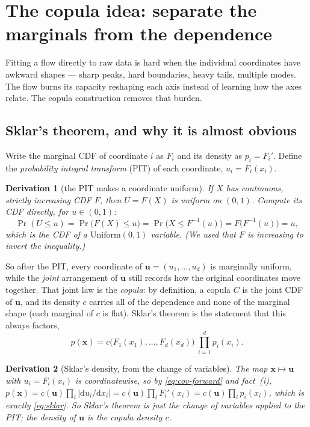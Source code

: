 \documentclass[11pt]{article}
\newcommand{\x}{\bm{x}}
\newcommand{\uu}{\bm{u}}
\newtheorem*{deriv}{Derivation}
\theoremstyle{remark}
\begin{document}
\section{The copula idea: separate the marginals from the dependence}
\label{sec:copula}

Fitting a flow directly to raw data is hard when the individual coordinates have
awkward shapes --- sharp peaks, hard boundaries, heavy tails, multiple modes.
The flow burns its capacity reshaping each axis instead of learning how the axes
relate. The copula construction removes that burden.

\subsection{Sklar's theorem, and why it is almost obvious}

Write the marginal CDF of coordinate $i$ as $F_i$ and its density as
$p_i=F_i'$. Define the \emph{probability integral transform} (PIT) of each
coordinate, $u_i=F_i(x_i)$.

\begin{deriv}[the PIT makes a coordinate uniform]
If $X$ has continuous, strictly increasing CDF $F$, then $U=F(X)$ is uniform on
$(0,1)$. Compute its CDF directly, for $u\in(0,1)$:
\begin{equation}
\Pr(U\le u)=\Pr\bigl(F(X)\le u\bigr)=\Pr\bigl(X\le F^{-1}(u)\bigr)
= F\bigl(F^{-1}(u)\bigr)=u,
\end{equation}
which is the CDF of a $\mathrm{Uniform}(0,1)$ variable. (We used that $F$ is
increasing to invert the inequality.)
\end{deriv}

So after the PIT, every coordinate of $\uu=(u_1,\dots,u_d)$ is marginally
uniform, while the \emph{joint} arrangement of $\uu$ still records how the
original coordinates move together. That joint law is the \emph{copula}: by
definition, a copula $C$ is the joint CDF of $\uu$, and its density $c$ carries
all of the dependence and none of the marginal shape (each marginal of $c$ is
flat). Sklar's theorem is the statement that this always factors,
\begin{equation}
\label{eq:sklar}
p(\x)=c\bigl(F_1(x_1),\dots,F_d(x_d)\bigr)\ \prod_{i=1}^{d} p_i(x_i).
\end{equation}

\begin{deriv}[Sklar's density, from the change of variables]
The map $\x\mapsto\uu$ with $u_i=F_i(x_i)$ is coordinatewise, so by
\eqref{eq:cov-forward} and fact~(i),
$p(\x)=c(\uu)\prod_i|\mathrm{d}u_i/\mathrm{d}x_i|
      =c(\uu)\prod_i F_i'(x_i)=c(\uu)\prod_i p_i(x_i)$,
which is exactly \eqref{eq:sklar}. So Sklar's theorem is just the change of
variables applied to the PIT; the density of $\uu$ \emph{is} the copula density
$c$.
\end{deriv}
\end{document}
